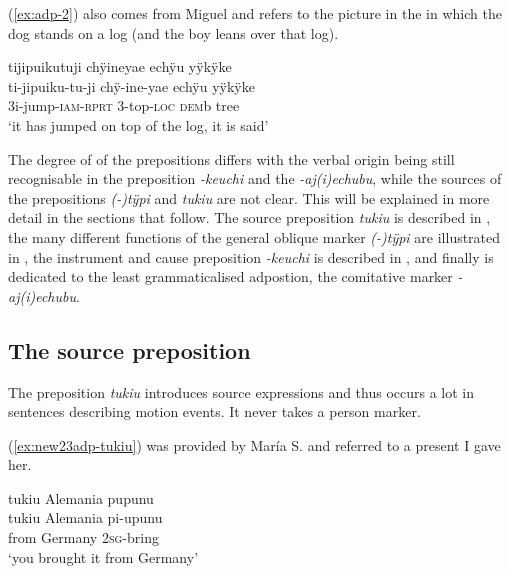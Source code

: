 (\ref{ex:adp-2}) also comes from Miguel and refers to the picture in the  in which the dog stands on a log (and the boy leans over that log).

\ea\label{ex:adp-2}
\begingl
\glpreamble tijipuikutuji chÿineyae echÿu yÿkÿke\\
\gla ti-jipuiku-tu-ji chÿ-ine-yae echÿu yÿkÿke\\
\glb 3i-jump-\textsc{iam}-\textsc{rprt} 3-top-\textsc{loc} \textsc{dem}b tree\\
\glft ‘it has jumped on top of the log, it is said’
\endgl
\trailingcitation{[mtx-a110906l.207]}
\xe


The degree of  of the prepositions differs with the verbal origin being still recognisable in the  preposition \textit{-keuchi} and the  \textit{-aj(i)echubu}, while the sources of the prepositions \textit{(-)tÿpi} and \textit{tukiu} are not clear. This will be explained in more detail in the sections that follow. The source preposition \textit{tukiu} is described in , the many different functions of the general oblique marker \textit{(-)tÿpi} are illustrated in , the instrument and cause preposition \textit{-keuchi} is described in , and finally  is dedicated to the least grammaticalised adpostion, the comitative marker \textit{-aj(i)echubu}.

\subsection{The source preposition}\label{sec:adp-tukiu}

The preposition \textit{tukiu} introduces source expressions and thus occurs a lot in sentences describing motion events. It never takes a person marker. 

(\ref{ex:new23adp-tukiu}) was provided by María S. and referred to a present I gave her.

\ea\label{ex:new23adp-tukiu}
\begingl
\glpreamble tukiu Alemania pupunu\\
\gla tukiu Alemania pi-upunu\\
\glb from Germany 2\textsc{sg}-bring\\
\glft ‘you brought it from Germany’
\endgl
\trailingcitation{[rxx-e120511l.016]}
\xe

